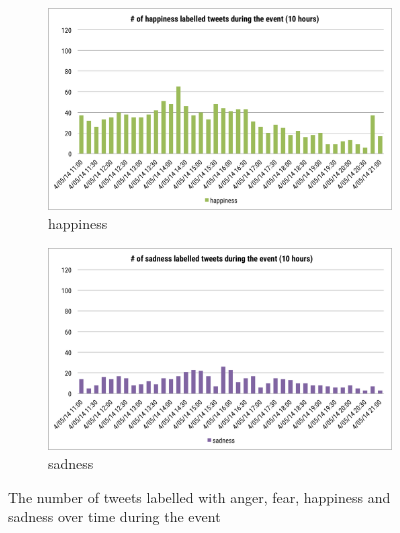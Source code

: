 \begin{figure}[htb!]
\begin{subfigure}{0.5\textwidth}
\centering    
\includegraphics[width=0.98\linewidth]{HappinessInstanceEvent}
\caption{happiness}
\label{fig:happinessInstanceEvent}
\end{subfigure}%
\begin{subfigure}{0.5\textwidth}
\centering    
\includegraphics[width=0.98\linewidth]{SadnessInstanceEvent}
\caption{sadness}
\label{fig:sadnessInstanceEvent}
\end{subfigure}
\caption{The number of tweets labelled with anger, fear, happiness and sadness over time during the event}
\end{figure}

